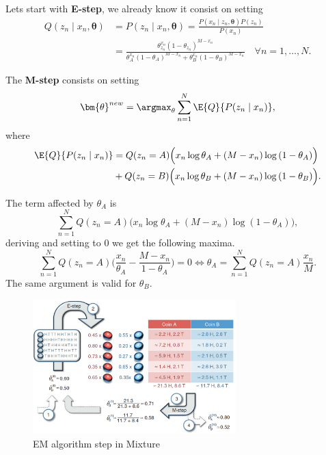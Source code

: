 Lets start with \textbf{E-step}, we already know it consist on setting
\[
  \begin{aligned}
    Q(z_{n} \mid x_{n}, \bm{\theta}) &= P(z_{n} \mid x_{n}, \bm{\theta}) = \frac{P(x_{n} \mid z_{n}, \bm{\theta})P(z_{n})}{P(x_{n})} \\
    &= \frac{\theta_{z_{n}}^{x_{n}}(1-\theta_{z_{n}})^{M - x_{n}}}{  \theta_{A}^{x_{n}}(1-\theta_{A})^{M - x_{n}} + \theta_{B}^{x_{n}}(1-\theta_{B})^{M - x_{n}}} \quad \forall n=1,\dots,N.
  \end{aligned}
\]

The \textbf{M-step} consists on setting
\[
  \bm{\theta}^{new} = \argmax_{\theta} \sum_{n=1}^{N}\E{Q}{P(z_{n} \mid x_{n})},
\]
where
\[
  \begin{aligned}
    \E{Q}{P(z_{n} \mid x_{n})} &= Q(z_{n} = A)\Big( x_{n}\log{\theta_{A}} + (M - x_{n})\log{(1 - \theta_{A})} \Big)\\
    &+ Q(z_{n} = B)\Big( x_{n}\log{\theta_{B}} + (M - x_{n})\log{(1 - \theta_{B})} \Big).
  \end{aligned}
\]

The term affected by \(\theta_{A}\) is
\[
  \sum_{n=1}^{N} Q(z_{n}=A) \Big(x_{n}\log{\theta_{A}} + (M - x_{n})\log{(1-\theta_{A})}\Big),
\]
deriving and setting to \(0\) we get the following maxima.
\[
  \sum_{n=1}^{N}Q(z_{n}=A)\Big(\frac{x_{n}}{\theta_{A}} - \frac{M - x_{n}}{1- \theta_{A}}\Big) = 0 \iff \theta_{A} = \sum_{n=1}^{N}Q(z_{n}=A)\frac{x_{n}}{M}.
\]
The same argument is valid for \(\theta_{B}\).

\begin{figure}
  \centering
  \includegraphics[width=0.7\textwidth]{Chapters/BayesianNetworksLearning/mixture}
  \caption{EM algorithm step in Mixture \cite{do2008expectation}}\label{fig:mixture}
\end{figure}

